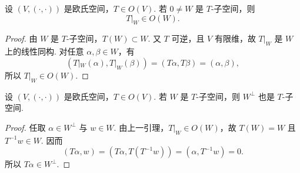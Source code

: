 \begin{lemma}
	设 $(V,(\cdot,\cdot))$ 是欧氏空间，$T\in O(V)$. 若 $0\ne W$ 是 $T$-子空间，则
	\[
	T|_W\in O(W).
	\]
\end{lemma}
\begin{proof}
	由 $W$ 是 $T$-子空间，$T(W)\subset W$. 又 $T$ 可逆，且 $V$ 有限维，故 $T|_W$ 是 $W$ 上的线性同构. 对任意 $\alpha,
	\beta\in W$，有
	\[
	(T|_W(\alpha),T|_W(\beta))=(T\alpha,T\beta)=(\alpha,\beta),
	\]
	所以 $T|_W\in O(W)$.
\end{proof}

\begin{corollary}\label{T-子空间}
	设 $(V,(\cdot,\cdot))$ 是欧氏空间，$T\in O(V)$. 若 $W$ 是 $T$-子空间，则 $W^\perp$ 也是 $T$-子空间.
\end{corollary}
\begin{proof}
	任取 $\alpha\in W^\perp$ 与 $w\in W$. 由上一引理，$T|_W\in O(W)$，故 $T(W)=W$ 且 $T^{-1}w\in W$. 因而
	\[
	(T\alpha,w)=(T\alpha,T(T^{-1}w))=(\alpha,T^{-1}w)=0.
	\]
	所以 $T\alpha\in W^\perp$.
\end{proof}

